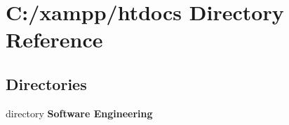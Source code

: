 \section{C\+:/xampp/htdocs Directory Reference}
\label{dir_10a6f60a3f69272b5db7ea1b7bf5dbe7}
\subsection*{Directories}
\begin{DoxyCompactItemize}
\item 
directory {\bf Software Engineering}
\end{DoxyCompactItemize}
